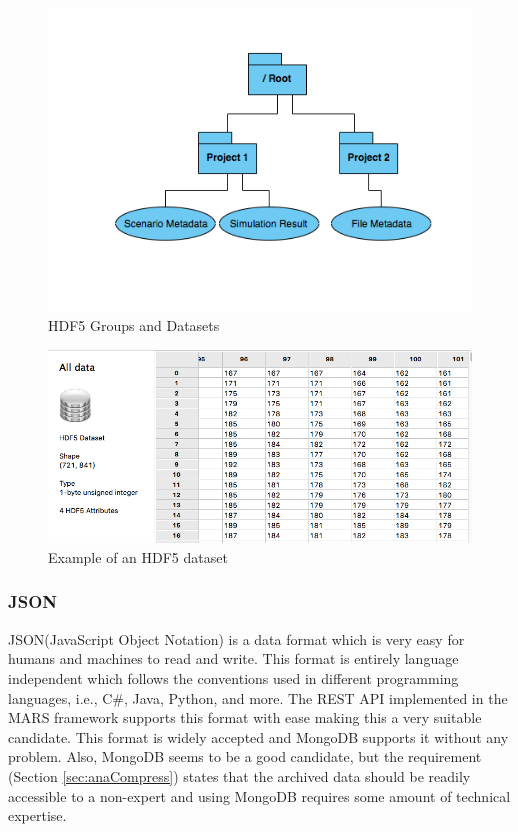 \begin{figure}[H]
    \centering \includegraphics[scale=0.6]{grafiken/groupsHDF5.png}
    \caption{HDF5 Groups and Datasets \cite{HDF5}}
    \label{fig:HDF5}
\end{figure}

\begin{figure}[H]
    \centering \includegraphics[scale=0.45]{grafiken/dataset.png}
    \caption{Example of an HDF5 dataset}
    \label{fig:dataset}
\end{figure}

\subsubsection{JSON} 
JSON(JavaScript Object Notation) is a data format which is very easy for humans and machines to read and write. This format is
entirely language independent which follows the conventions used in different programming languages, i.e., C\#, Java, Python, and more. The REST API implemented in the
MARS framework supports this format with ease making this a very suitable candidate. This format is widely 
accepted and MongoDB supports it without any problem. Also, MongoDB seems to be a good candidate, but the requirement (Section \ref{sec:anaCompress}) states that the archived
data should be readily accessible to a non-expert and using MongoDB requires some amount of technical expertise.


